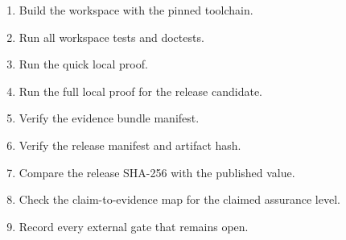 \documentclass[11pt,a4paper]{article}
\theoremstyle{plain}
\theoremstyle{definition}
\theoremstyle{remark}
\begin{document}
\begin{enumerate}[leftmargin=1.5em]
  \item Build the workspace with the pinned toolchain.
  \item Run all workspace tests and doctests.
  \item Run the quick local proof.
  \item Run the full local proof for the release candidate.
  \item Verify the evidence bundle manifest.
  \item Verify the release manifest and artifact hash.
  \item Compare the release SHA-256 with the published value.
  \item Check the claim-to-evidence map for the claimed assurance level.
  \item Record every external gate that remains open.
\end{enumerate}



\end{document}
